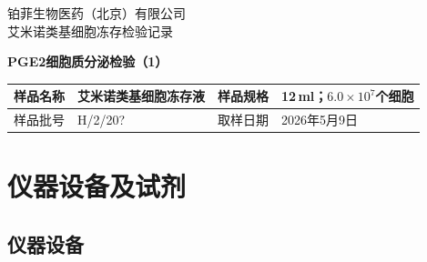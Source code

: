 \documentclass[UTF8,10pt,a4paper,fontset=fandol]{ctexart}
\newcommand{\fieldvalue}[1]{#1}
\newcommand{\handwritten}[1]{#1}
\begin{document}
\begin{center}
{\small 铂菲生物医药（北京）有限公司}\\[-0.2em]
{\large 艾米诺类基细胞冻存检验记录}
\end{center}

\noindent\textbf{PGE2细胞质分泌检验（1）}

\begin{tabular}{|p{2.5cm}|p{3.2cm}|p{2.5cm}|p{4.0cm}|}
\hline
样品名称 &
\fieldvalue{艾米诺类基细胞冻存液} &
样品规格 &
\fieldvalue{12\,ml；$6.0\times10^{7}$个细胞}\\
\hline
样品批号 &
\fieldvalue{\handwritten{H/2/20?}} &
取样日期 &
\fieldvalue{\handwritten{2026年5月9日}}\\
\hline
\end{tabular}

\section{仪器设备及试剂}

\subsection{仪器设备}
\end{document}
